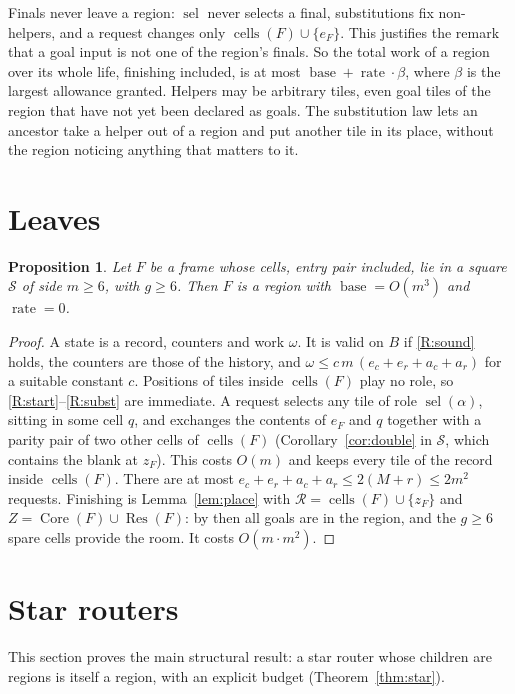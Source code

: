 \documentclass[11pt]{amsart}
\newtheorem{proposition}[theorem]{Proposition}
\theoremstyle{definition}
\newcommand{\cells}{\operatorname{cells}}
\newcommand{\Core}{\operatorname{Core}}
\newcommand{\Res}{\operatorname{Res}}
\newcommand{\sel}{\operatorname{sel}}
\newcommand{\base}{\operatorname{base}}
\newcommand{\rate}{\operatorname{rate}}
\begin{document}
Finals never leave a region: $\sel$ never selects a final, substitutions fix non-helpers, and a request changes only
$\cells(F)\cup\{e_F\}$. This justifies the remark that a goal input is not one of the region's finals.
So the total work of a region over its whole life, finishing included, is at most $\base+\rate\cdot\beta$, where $\beta$ is
the largest allowance granted. Helpers may be arbitrary tiles, even goal tiles of the region that have not yet been
declared as goals. The substitution law lets an ancestor take a helper out of a region and put another tile in its
place, without the region noticing anything that matters to it.

\section{Leaves}\label{sec:leaf}

\begin{proposition}\label{prop:leaf}
Let $F$ be a frame whose cells, entry pair included, lie in a square $\mathcal S$ of side $m\ge6$, with
$g\ge 6$. Then $F$ is a region with $\base=O(m^3)$ and $\rate=0$.
\end{proposition}

\begin{proof}
A state is a record, counters and work $\omega$. It is valid on $B$ if \ref{R:sound} holds, the counters are those of
the history, and $\omega\le c\,m\,(e_c+e_r+a_c+a_r)$ for a suitable constant $c$. Positions of tiles inside $\cells(F)$ play no role,
so \ref{R:start}--\ref{R:subst} are immediate. A request selects any tile of role $\sel(\alpha)$, sitting in some cell $q$, and
exchanges the contents of $e_F$ and $q$ together with a parity pair of two other cells of $\cells(F)$ (Corollary~\ref{cor:double}
in $\mathcal S$, which contains the blank at $z_F$). This costs $O(m)$ and keeps every tile of the record inside $\cells(F)$.
There are at most $e_c+e_r+a_c+a_r\le2(M+r)\le2m^2$ requests. Finishing is Lemma~\ref{lem:place} with
$\mathcal R=\cells(F)\cup\{z_F\}$ and $Z=\Core(F)\cup\Res(F)$: by then all goals are in the region, and the $g\ge6$ spare cells
provide the room. It costs $O(m\cdot m^2)$.
\end{proof}

\section{Star routers}\label{sec:star}

This section proves the main structural result: a star router whose children are
regions is itself a region, with an explicit budget (Theorem~\ref{thm:star}).
\end{document}
